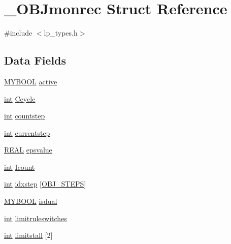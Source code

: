 \hypertarget{struct___o_b_jmonrec}{}\section{\+\_\+\+O\+B\+Jmonrec Struct Reference}
\label{struct___o_b_jmonrec}


{\ttfamily \#include $<$lp\+\_\+types.\+h$>$}

\subsection*{Data Fields}
\begin{DoxyCompactItemize}
\item 
\hyperlink{lp__lib_8h_aad848328fb3018217ac9f01d97b6bd88}{M\+Y\+B\+O\+OL} \hyperlink{struct___o_b_jmonrec_a84f53b0ac381fa3bc113f25facca2c79}{active}
\item 
\hyperlink{lp__lib_8h_adeb9ec6400320e4923ac9d836d509ddb}{int} \hyperlink{struct___o_b_jmonrec_a18832b856ee2a4fb53394eb6d5b35b17}{Ccycle}
\item 
\hyperlink{lp__lib_8h_adeb9ec6400320e4923ac9d836d509ddb}{int} \hyperlink{struct___o_b_jmonrec_ab8689ce8309a2c157381d645031207cd}{countstep}
\item 
\hyperlink{lp__lib_8h_adeb9ec6400320e4923ac9d836d509ddb}{int} \hyperlink{struct___o_b_jmonrec_aa5c04234da1914b7671be18f402266dd}{currentstep}
\item 
\hyperlink{lp__lib_8h_a92bd5e363d131fa73669358edb232dce}{R\+E\+AL} \hyperlink{struct___o_b_jmonrec_a38dde5936d5ba4f4b0b0a1d6e791b52d}{epsvalue}
\item 
\hyperlink{lp__lib_8h_adeb9ec6400320e4923ac9d836d509ddb}{int} \hyperlink{struct___o_b_jmonrec_ac6d31e4c31ddb356ab9c7a1b2dc0f074}{Icount}
\item 
\hyperlink{lp__lib_8h_adeb9ec6400320e4923ac9d836d509ddb}{int} \hyperlink{struct___o_b_jmonrec_abf4a304a4f7de590393ad9df2766f596}{idxstep} \mbox{[}\hyperlink{lp__types_8h_aa8a8789eed6cafa2ba54e5f621d5a7f6}{O\+B\+J\+\_\+\+S\+T\+E\+PS}\mbox{]}
\item 
\hyperlink{lp__lib_8h_aad848328fb3018217ac9f01d97b6bd88}{M\+Y\+B\+O\+OL} \hyperlink{struct___o_b_jmonrec_a5212f03055fe86c53c67c393f74ed83a}{isdual}
\item 
\hyperlink{lp__lib_8h_adeb9ec6400320e4923ac9d836d509ddb}{int} \hyperlink{struct___o_b_jmonrec_a57e67487950ac0d1da40f83b0d305f33}{limitruleswitches}
\item 
\hyperlink{lp__lib_8h_adeb9ec6400320e4923ac9d836d509ddb}{int} \hyperlink{struct___o_b_jmonrec_a2c90dfec4080e7185acc631417ec8dcd}{limitstall} \mbox{[}2\mbox{]}

\end{DoxyCompactItemize}
